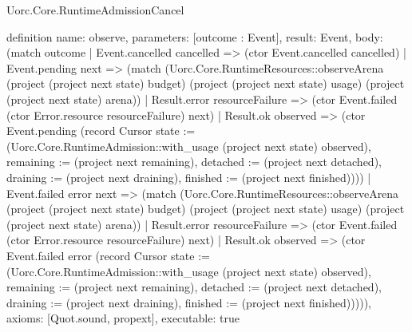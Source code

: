\begin{lexlean}{Uorc.Core.RuntimeAdmissionCancel}
\begin{semanticmodule}
definition{
  name: observe,
  parameters: [outcome : Event],
  result: Event,
  body: (match outcome
    | Event.cancelled cancelled => (ctor Event.cancelled cancelled)
    | Event.pending next => (match (Uorc.Core.RuntimeResources::observeArena (project (project next state) budget) (project (project next state) usage) (project (project next state) arena))
      | Result.error resourceFailure => (ctor Event.failed (ctor Error.resource resourceFailure) next)
      | Result.ok observed => (ctor Event.pending (record Cursor {state := (Uorc.Core.RuntimeAdmission::with_usage (project next state) observed), remaining := (project next remaining), detached := (project next detached), draining := (project next draining), finished := (project next finished)})))
    | Event.failed error next => (match (Uorc.Core.RuntimeResources::observeArena (project (project next state) budget) (project (project next state) usage) (project (project next state) arena))
      | Result.error resourceFailure => (ctor Event.failed (ctor Error.resource resourceFailure) next)
      | Result.ok observed => (ctor Event.failed error (record Cursor {state := (Uorc.Core.RuntimeAdmission::with_usage (project next state) observed), remaining := (project next remaining), detached := (project next detached), draining := (project next draining), finished := (project next finished)})))),
  axioms: [Quot.sound, propext],
  executable: true
}


\end{semanticmodule}
\end{lexlean}
